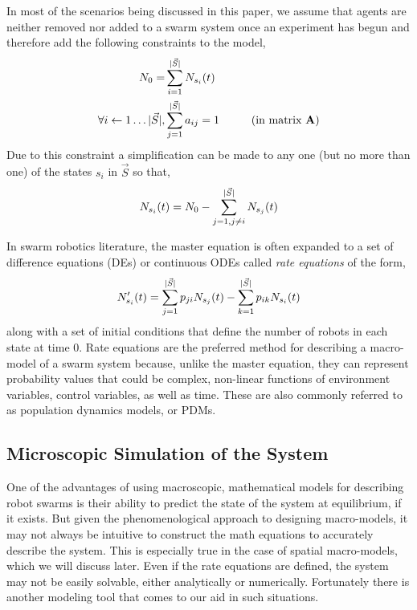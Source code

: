 \documentclass[Main.tex]{subfiles}
\begin{document}
In most of the scenarios being discussed in this paper, we assume that agents are neither removed nor added to a swarm system once an experiment has begun and therefore add the following constraints to the model,
\begin{align}
N_0 = & \sum\limits^{\lvert\vec{S}\rvert}_{i=1} N_{s_i}(t)\\
\forall i \gets 1\ldots\lvert\vec{S}\rvert, & \sum\limits^{\lvert\vec{S}\rvert}_{j=1}a_{ij} = 1 \hspace{1cm}\text{(in matrix $\mathbf{A}$)}
\end{align}
Due to this constraint a simplification can be made to any one (but no more than one) of the states $s_i$ in $\vec{S}$ so that,
\begin{equation}
	N_{s_i}(t) = N_0 - \sum\limits_{j=1,j\not=i}^{\lvert\vec{S}\rvert}N_{s_j}(t)
\end{equation}

In swarm robotics literature, the master equation is often expanded to a set of difference equations (DEs) or continuous ODEs called \emph{rate equations} of the form,
\begin{equation}\label{eq:rateeqns}
	N_{s_i}'(t) = \sum\limits_{j=1}^{\lvert\vec{S}\rvert}p_{ji}N_{s_j}(t) - \sum\limits_{k=1}^{\lvert\vec{S}\rvert}p_{ik}N_{s_i}(t)
\end{equation}
along with a set of initial conditions that define the number of robots in each state at time 0. Rate equations are the preferred method for describing a macro-model of a swarm system because, unlike the master equation, they can represent probability values that could be complex, non-linear functions of environment variables, control variables, as well as time. These are also commonly referred to as population dynamics models, or PDMs.

\subsection{Microscopic Simulation of the System}
One of the advantages of using macroscopic, mathematical models for describing robot swarms is their ability to predict the state of the system at equilibrium, if it exists. But given the phenomenological approach to designing macro-models, it may not always be intuitive to construct the math equations to accurately describe the system. This is especially true in the case of spatial macro-models, which we will discuss later. Even if the rate equations are defined, the system may not be easily solvable, either analytically or numerically. Fortunately there is another modeling tool that comes to our aid in such situations. 
\end{document}
